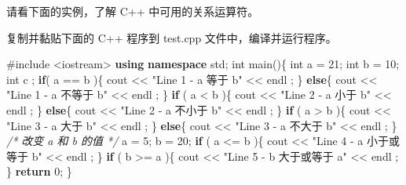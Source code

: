 \documentclass[
]{article}
\newenvironment{Shaded}{}{}
\newcommand{\CommentTok}[1]{\textcolor[rgb]{0.38,0.63,0.69}{\textit{#1}}}
\newcommand{\ControlFlowTok}[1]{\textcolor[rgb]{0.00,0.44,0.13}{\textbf{#1}}}
\newcommand{\DataTypeTok}[1]{\textcolor[rgb]{0.56,0.13,0.00}{#1}}
\newcommand{\DecValTok}[1]{\textcolor[rgb]{0.25,0.63,0.44}{#1}}
\newcommand{\ImportTok}[1]{#1}
\newcommand{\KeywordTok}[1]{\textcolor[rgb]{0.00,0.44,0.13}{\textbf{#1}}}
\newcommand{\NormalTok}[1]{#1}
\newcommand{\OperatorTok}[1]{\textcolor[rgb]{0.40,0.40,0.40}{#1}}
\newcommand{\PreprocessorTok}[1]{\textcolor[rgb]{0.74,0.48,0.00}{#1}}
\newcommand{\StringTok}[1]{\textcolor[rgb]{0.25,0.44,0.63}{#1}}
\begin{document}
请看下面的实例，了解 C++ 中可用的关系运算符。

复制并黏贴下面的 C++ 程序到 test.cpp 文件中，编译并运行程序。

\begin{Shaded}
\begin{Highlighting}[]
\PreprocessorTok{\#include }\ImportTok{\textless{}iostream\textgreater{}}
\KeywordTok{using} \KeywordTok{namespace}\NormalTok{ std}\OperatorTok{;} 
\DataTypeTok{int}\NormalTok{ main}\OperatorTok{()\{}
   \DataTypeTok{int}\NormalTok{ a }\OperatorTok{=} \DecValTok{21}\OperatorTok{;}   \DataTypeTok{int}\NormalTok{ b }\OperatorTok{=} \DecValTok{10}\OperatorTok{;}   \DataTypeTok{int}\NormalTok{ c }\OperatorTok{;} 
   \ControlFlowTok{if}\OperatorTok{(}\NormalTok{ a }\OperatorTok{==}\NormalTok{ b }\OperatorTok{)\{}
\NormalTok{      cout }\OperatorTok{\textless{}\textless{}} \StringTok{"Line 1 {-} a 等于 b"} \OperatorTok{\textless{}\textless{}}\NormalTok{ endl }\OperatorTok{;}
   \OperatorTok{\}}
   \ControlFlowTok{else}\OperatorTok{\{}
\NormalTok{      cout }\OperatorTok{\textless{}\textless{}} \StringTok{"Line 1 {-} a 不等于 b"} \OperatorTok{\textless{}\textless{}}\NormalTok{ endl }\OperatorTok{;}
   \OperatorTok{\}}
   \ControlFlowTok{if} \OperatorTok{(}\NormalTok{ a }\OperatorTok{\textless{}}\NormalTok{ b }\OperatorTok{)\{}
\NormalTok{      cout }\OperatorTok{\textless{}\textless{}} \StringTok{"Line 2 {-} a 小于 b"} \OperatorTok{\textless{}\textless{}}\NormalTok{ endl }\OperatorTok{;}
   \OperatorTok{\}}
   \ControlFlowTok{else}\OperatorTok{\{}
\NormalTok{      cout }\OperatorTok{\textless{}\textless{}} \StringTok{"Line 2 {-} a 不小于 b"} \OperatorTok{\textless{}\textless{}}\NormalTok{ endl }\OperatorTok{;}
   \OperatorTok{\}}
   \ControlFlowTok{if} \OperatorTok{(}\NormalTok{ a }\OperatorTok{\textgreater{}}\NormalTok{ b }\OperatorTok{)\{}
\NormalTok{      cout }\OperatorTok{\textless{}\textless{}} \StringTok{"Line 3 {-} a 大于 b"} \OperatorTok{\textless{}\textless{}}\NormalTok{ endl }\OperatorTok{;}
   \OperatorTok{\}}
   \ControlFlowTok{else}\OperatorTok{\{}
\NormalTok{      cout }\OperatorTok{\textless{}\textless{}} \StringTok{"Line 3 {-} a 不大于 b"} \OperatorTok{\textless{}\textless{}}\NormalTok{ endl }\OperatorTok{;}
   \OperatorTok{\}}
   \CommentTok{/* 改变 a 和 b 的值 */}
\NormalTok{   a }\OperatorTok{=} \DecValTok{5}\OperatorTok{;}\NormalTok{   b }\OperatorTok{=} \DecValTok{20}\OperatorTok{;}
   \ControlFlowTok{if} \OperatorTok{(}\NormalTok{ a }\OperatorTok{\textless{}=}\NormalTok{ b }\OperatorTok{)\{}
\NormalTok{      cout }\OperatorTok{\textless{}\textless{}} \StringTok{"Line 4 {-} a 小于或等于 b"} \OperatorTok{\textless{}\textless{}}\NormalTok{ endl }\OperatorTok{;}
   \OperatorTok{\}}
   \ControlFlowTok{if} \OperatorTok{(}\NormalTok{ b }\OperatorTok{\textgreater{}=}\NormalTok{ a }\OperatorTok{)\{}
\NormalTok{      cout }\OperatorTok{\textless{}\textless{}} \StringTok{"Line 5 {-} b 大于或等于 a"} \OperatorTok{\textless{}\textless{}}\NormalTok{ endl }\OperatorTok{;}
   \OperatorTok{\}}
   \ControlFlowTok{return} \DecValTok{0}\OperatorTok{;}
\OperatorTok{\}}
\end{Highlighting}
\end{Shaded}
\end{document}
